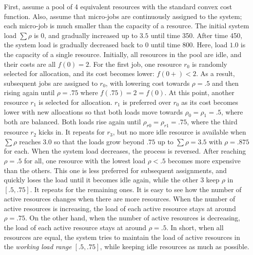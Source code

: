 First, assume a pool of 4 equivalent resources with the standard convex
cost function.
Also, assume that micro-jobs are continuously assigned to the
system; each micro-job is much smaller than the capacity of a
resource.
The initial system load $\sum \rho$ is $0$, and gradually increased up
to $3.5$ until time 350. After time 450, the system load is gradually
decreased back to $0$ until time 800.
Here, load $1.0$ is the capacity of a single resource.
Initially, all resources in the pool are idle, and their costs are
all $f(0)= 2$.
For the first job, one resource $r_{0}$ is randomly selected for allocation, and its
cost becomes lower: $f(0+) < 2$. As a result, subsequent jobs are
assigned to $r_{0}$, with lowering cost towards $\rho = .5$ and then
rising again until $\rho = .75$ where $f(.75) = 2 = f(0)$.
At this point, another resource $r_{1}$ is selected for allocation.
$r_{1}$ is preferred over $r_{0}$ as its cost becomes lower with new
allocations so that both loads move towards $\rho_{0} = \rho_{1} = .5$,
where both are balanced.
Both loads rise again until $\rho_{r0} = \rho_{r1} = .75$,
where the third resource $r_{2}$ kicks in.
It repeats for $r_{3}$, but no more idle resource is available
when $\sum \rho$ reaches $3.0$ so that the loads grow beyond $.75$
up to $\sum \rho = 3.5$ with $\rho = .875$ for each.
When the system load decreases, the process is reversed.
After reaching $\rho = .5$ for all,
one resource with the lowest load $\rho < .5$ becomes more expensive
than the others.
This one is less preferred for subsequent assignments, and quickly
loses the load until it becomes idle again, while the other 3 keep
$\rho$ in $[.5, .75]$. It repeats for the remaining ones.
It is easy to see how the number of active resources changes when
there are more resources.
When the number of active resources is increasing, the load of each
active resource stays at around $\rho = .75$.
On the other hand, when the number of active resources is decreasing,
the load of each active resource stays at around $\rho = .5$.
In short, when all resources are equal, the system tries to maintain
the load of active resources in the {\em working load range}
$[.5, .75]$, while keeping idle resources as much as possible.


